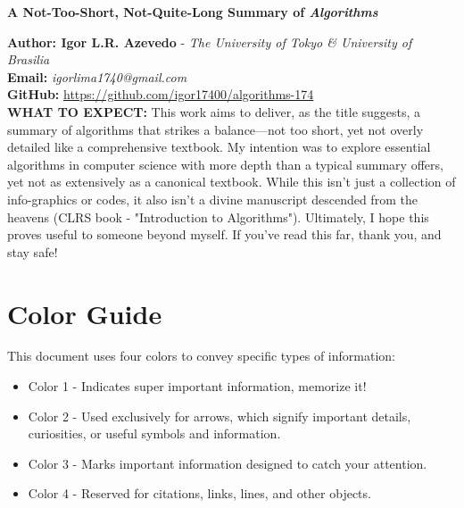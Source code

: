 \documentclass[a4paper,10pt]{article}
\begin{document}
\noindent 
\begin{center}
\textbf{{\LARGE A Not-Too-Short, Not-Quite-Long Summary of \textit{Algorithms}}} 
\end{center}
\vspace{1cm}

\noindent 
\textbf{Author: Igor L.R. Azevedo} - \textit{The University of Tokyo \& University of Brasilia}
\\
\textbf{Email:} \textit{igorlima1740@gmail.com}
\\
\textbf{GitHub:} \url{https://github.com/igor17400/algorithms-174}
\\


\noindent 
\textbf{WHAT TO EXPECT: } This work aims to deliver, as the title suggests, a summary of algorithms that strikes a balance—not too short, yet not overly detailed like a comprehensive textbook. My intention was to explore essential algorithms in computer science with more depth than a typical summary offers, yet not as extensively as a canonical textbook. While this isn't just a collection of info-graphics or codes, it also isn't a divine manuscript descended from the heavens (CLRS book - "Introduction to Algorithms"). Ultimately, I hope this proves useful to someone beyond myself. If you've read this far, thank you, and stay safe!
\\

\newpage

\tableofcontents

\newpage

\section{Color Guide}

This document uses four colors to convey specific types of information:
\begin{itemize}
    \item \colorbox{color1}{Color 1} - Indicates super important information, memorize it!
    \item \colorbox{color2}{Color 2} - Used exclusively for arrows, which signify important details, curiosities, or useful symbols and information.
    \item \colorbox{color3}{Color 3} - Marks important information designed to catch your attention.
    \item \colorbox{color4}{Color 4} - Reserved for citations, links, lines, and other objects.
\end{itemize}
\end{document}
